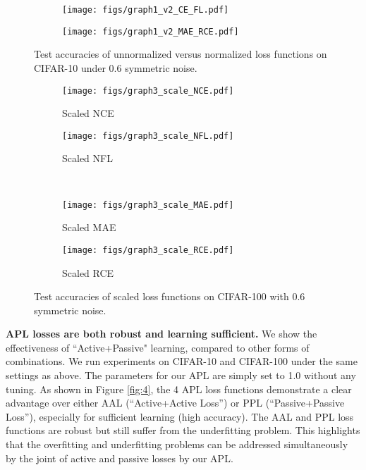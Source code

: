 \documentclass{article}
\begin{document}
\begin{figure}[!t]
	\centering
	\begin{subfigure}{0.48\linewidth}
		\texttt{[image: figs/graph1\_v2\_CE\_FL.pdf]}
		\label{ce_nce}
	\end{subfigure}
	\begin{subfigure}{0.48\linewidth} 
		\texttt{[image: figs/graph1\_v2\_MAE\_RCE.pdf]}
		\label{fl_nfl}
	\end{subfigure}
	\vspace{-0.25 in}
	\caption{Test accuracies of unnormalized versus normalized loss functions on CIFAR-10 under 0.6 symmetric noise. }
	\label{fig:2}
\end{figure}

\begin{figure}[!t]
	\centering
	\begin{subfigure}{0.48\linewidth}
		\texttt{[image: figs/graph3\_scale\_NCE.pdf]}
		\caption{Scaled NCE}
		\label{nce_scale}
	\end{subfigure}
	\begin{subfigure}{0.48\linewidth} 
		\texttt{[image: figs/graph3\_scale\_NFL.pdf]}
		\caption{Scaled NFL}
		\label{nfl_scale}
	\end{subfigure}\\
	\begin{subfigure}{0.48\linewidth}
		\texttt{[image: figs/graph3\_scale\_MAE.pdf]}
		\caption{Scaled MAE}
		\label{mae_scale}
	\end{subfigure}
	\begin{subfigure}{0.48\linewidth} 
		\texttt{[image: figs/graph3\_scale\_RCE.pdf]}
		\caption{Scaled RCE}
		\label{rce_scale}
	\end{subfigure}
	\vspace{-0.1 in}
	\caption{Test accuracies of scaled loss functions on CIFAR-100 with 0.6 symmetric noise.}
 	\vspace{-0.15 in}
	\label{fig:3}
\end{figure}


\noindent\textbf{APL losses are both robust and learning sufficient.}
We show the effectiveness of ``Active+Passive" learning, compared to other forms of combinations. We run experiments on CIFAR-10 and CIFAR-100 under the same settings as above. The parameters  for our APL are simply set to 1.0 without any tuning.
As shown in Figure \ref{fig:4}, the 4 APL loss functions demonstrate a clear advantage over either AAL (``Active+Active Loss'') or PPL (``Passive+Passive Loss''), especially for sufficient learning (high accuracy).
The AAL and PPL loss functions are robust but still suffer from the underfitting problem. This highlights that the overfitting and underfitting problems can be addressed simultaneously by the joint of active and passive losses by our APL.
\end{document}
